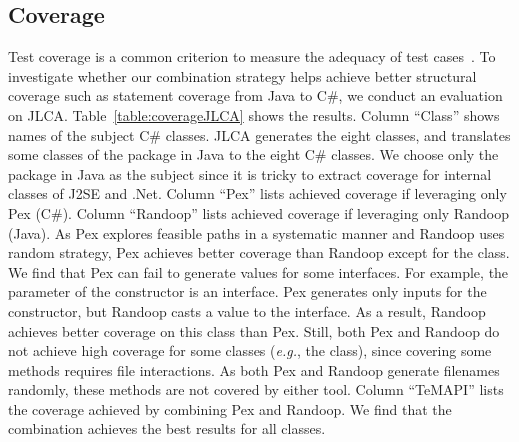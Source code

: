 \subsection{Coverage}
\label{sec:evaluation:coverage}


Test coverage is a common criterion to measure the adequacy of test cases~\cite{zhu1997software}. To investigate whether our combination strategy helps achieve better structural coverage such as statement coverage from Java to C\#, we conduct an evaluation on JLCA. Table~\ref{table:coverageJLCA} shows the results. Column ``Class'' shows names of the subject C\# classes. JLCA generates the eight classes, and translates some classes of the  package in Java to the eight C\# classes. We choose only the  package in Java as the subject since it is tricky to extract coverage for internal classes of J2SE and .Net. Column ``Pex'' lists achieved coverage if leveraging only Pex (C\#). Column ``Randoop'' lists  achieved coverage if leveraging only Randoop (Java). As Pex explores feasible paths in a systematic manner and Randoop uses random strategy, Pex achieves better coverage than Randoop except for the  class. We find that Pex can fail to generate  values for some interfaces. For example, the parameter of the  constructor is an interface. Pex generates only  inputs for the constructor, but Randoop casts a value to the interface. As a result, Randoop achieves better coverage on this class than Pex. Still, both Pex and Randoop do not achieve high coverage for some classes (\emph{e.g.}, the  class), since covering some methods requires file interactions. As both Pex and Randoop generate filenames randomly, these methods are not covered by either tool. Column ``TeMAPI'' lists the coverage achieved by combining Pex and Randoop. We find that the combination achieves the best results for all classes.

